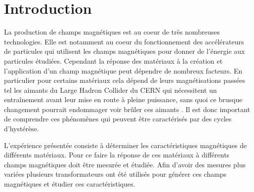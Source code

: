 \section{Introduction}

La production de champs magnétiques est au coeur de très nombreuses technologies. Elle est notamment au coeur du fonctionnement des accélérateurs de particules qui utilisent les champs magnétiques pour donner de l'énergie aux particules étudiées. Cependant la réponse des matériaux à la création et l'application d'un champ magnétique peut dépendre de nombreux facteurs. En particulier pour certains matériaux cela dépend de leurs magnétisations passées tel les aimants du Large Hadron Collider du CERN qui nécessitent un entraînement avant leur mise en route à pleine puissance, sans quoi ce brusque changement pourrait endommager voir brûler ces aimants \cite{CERN_aimants}. Il est donc important de comprendre ces phénomènes qui peuvent être caractérisés par des cycles d'hystérèse.

L'expérience présentée consiste à déterminer les caractéristiques magnétiques de différents matériaux. Pour ce faire la réponse de ces matériaux à différents champs magnétiques doit être mesurée et étudiée. Afin d'avoir des mesures plus variées plusieurs transformateurs ont été utilisés pour générer ces champs magnétiques et étudier ces caractéristiques.